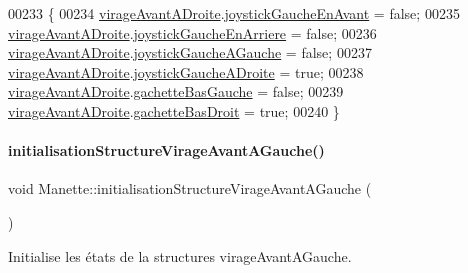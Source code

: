 \begin{DoxyCode}
00233 \{
00234     \hyperlink{class_manette_a91afd62402f690f74a7e351c9aa8f6ec}{virageAvantADroite}.\hyperlink{struct_etat_manette_deplacement_a8c8e3ca694408bc6a6ced4e20b9da0be}{joystickGaucheEnAvant} = \textcolor{keyword}{false};
00235     \hyperlink{class_manette_a91afd62402f690f74a7e351c9aa8f6ec}{virageAvantADroite}.\hyperlink{struct_etat_manette_deplacement_a584cf1538425c87588c5b96b79c8d482}{joystickGaucheEnArriere} = \textcolor{keyword}{false};
00236     \hyperlink{class_manette_a91afd62402f690f74a7e351c9aa8f6ec}{virageAvantADroite}.\hyperlink{struct_etat_manette_deplacement_af7e92a8d8f116e2bc4a5a95386f604e7}{joystickGaucheAGauche} = \textcolor{keyword}{false};
00237     \hyperlink{class_manette_a91afd62402f690f74a7e351c9aa8f6ec}{virageAvantADroite}.\hyperlink{struct_etat_manette_deplacement_a8fa93da5af430ac00ffd4ee8b76987a2}{joystickGaucheADroite} = \textcolor{keyword}{true};
00238     \hyperlink{class_manette_a91afd62402f690f74a7e351c9aa8f6ec}{virageAvantADroite}.\hyperlink{struct_etat_manette_deplacement_a0d197e25bc2e0402a068a8d012c25472}{gachetteBasGauche} = \textcolor{keyword}{false};
00239     \hyperlink{class_manette_a91afd62402f690f74a7e351c9aa8f6ec}{virageAvantADroite}.\hyperlink{struct_etat_manette_deplacement_a4588620c1e2a3543ce67c9a791aac106}{gachetteBasDroit} = \textcolor{keyword}{true};
00240 \}
\end{DoxyCode}
\mbox{\label{class_manette_aa02a2dfa49318e1043b52dd103fa1795}} 
\paragraph{\texorpdfstring{initialisation\+Structure\+Virage\+Avant\+A\+Gauche()}{initialisationStructureVirageAvantAGauche()}}
{\footnotesize\ttfamily void Manette\+::initialisation\+Structure\+Virage\+Avant\+A\+Gauche (\begin{DoxyParamCaption}{ }\end{DoxyParamCaption})\hspace{0.3cm}{\ttfamily [private]}}



Initialise les états de la structures virage\+Avant\+A\+Gauche. 



